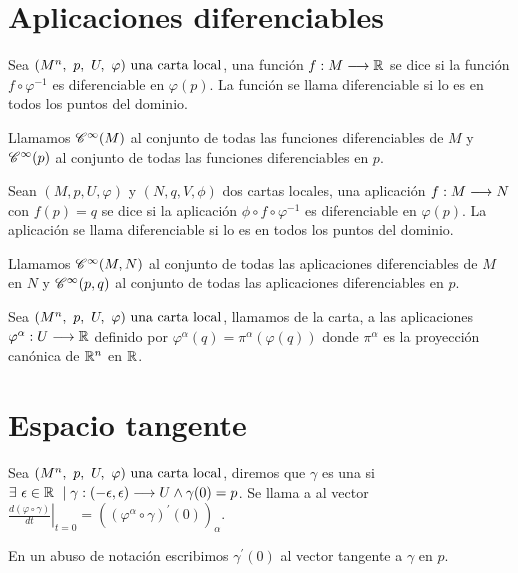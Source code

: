 \section{Aplicaciones diferenciables}\label{sec:aplicaciones-diferenciables}

\begin{definition}
  Sea $(M^n,\ p,\ U,\ \varphi)\textmd{ una carta local}$, una función $f:M\longrightarrow \mathbb{R}$ se dice
   si la función $f\circ\varphi^{-1}$ es
  diferenciable en $\varphi(p)$.
  La función se llama diferenciable si lo es en todos los puntos del dominio.
\end{definition}

\begin{notation}
  Llamamos $\mathscr{C}^\infty(M)$ al conjunto de todas las funciones diferenciables de $M$ y
  $\mathscr{C}^\infty(p)$ al conjunto de todas las funciones diferenciables en $p$.
\end{notation}

\begin{definition}
  Sean $(M, p, U, \varphi)$ y $(N, q, V, \phi)$ dos cartas locales, una aplicación
  $f:M\longrightarrow N$ con $f(p)=q$ se dice
   si la aplicación
  $\phi\circ f\circ\varphi^{-1}$ es diferenciable en $\varphi(p)$.
  La aplicación se llama diferenciable si lo es en todos los puntos del dominio.
\end{definition}

\begin{notation}
  Llamamos $\mathscr{C}^\infty(M, N)$ al conjunto de todas las aplicaciones diferenciables de $M$ en $N$ y
  $\mathscr{C}^\infty(p, q)$ al conjunto de todas las aplicaciones diferenciables en $p$.
\end{notation}

\begin{definition}
  Sea $(M^n,\ p,\ U,\ \varphi)\textmd{ una carta local}$, llamamos  de la carta, a las
  aplicaciones $\varphi^\alpha:U\longrightarrow \mathbb{R}$ definido por $\varphi^\alpha(q)=\pi^\alpha(\varphi
  (q))$
  donde $\pi^\alpha$ es la proyección canónica de $\mathbb{R}^n$ en $\mathbb{R}$.
\end{definition}


\section{Espacio tangente}\label{sec:espacio-tangente}
\begin{definition}
  Sea $(M^n,\ p,\ U,\ \varphi)\textmd{ una carta local}$, diremos que $\gamma$ es una  si $\exists\ \epsilon\in\mathbb{R} \ \mid \gamma:(-\epsilon,\epsilon)\longrightarrow U\land
  \gamma(0)=p$.
  Se llama  a al vector $\left.\frac{d(\varphi\circ\gamma)
  }{dt}\right|_{t=0}=((\varphi^\alpha\circ\gamma)^{'}(0))_\alpha$.
\end{definition}
\begin{notation}
  En un abuso de notación escribimos $\gamma^{'}(0)$ al vector tangente a $\gamma$ en $p$.
\end{notation}

